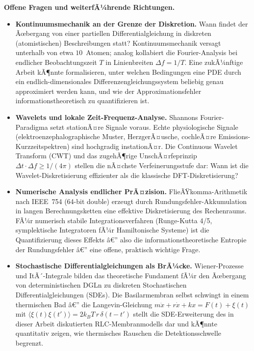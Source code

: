 ﻿\documentclass[12pt,a4paper,titlepage]{report}
\begin{document}
\textbf{Offene Fragen und weiterfÃ¼hrende Richtungen.}
\begin{itemize}[leftmargin=2em]
  \item \textbf{Kontinuumsmechanik an der Grenze der Diskretion.}
    Wann findet der Ãœbergang von einer partiellen Differentialgleichung
    in diskreten (atomistischen) Beschreibungen statt?
    Kontinuumsmechanik versagt unterhalb von etwa $10$~Atomen;
    analog kollabiert die Fourier-Analysis bei endlicher Beobachtungszeit
    $T$ in Linienbreiten $\Delta f = 1/T$.
    Eine zukÃ¼nftige Arbeit kÃ¶nnte formalisieren, unter welchen Bedingungen
    eine PDE durch ein endlich-dimensionales Differenzengleichungssystem
    beliebig genau approximiert werden kann, und wie der Approximationsfehler
    informationstheoretisch zu quantifizieren ist.
  \item \textbf{Wavelets und lokale Zeit-Frequenz-Analyse.}
    Shannons Fourier-Paradigma setzt stationÃ¤re Signale voraus.
    Echte physiologische Signale (elektroenzephalographische Muster,
    HerzgerÃ¤usche, cochleÃ¤re Emissions-Kurzzeitspektren) sind
    hochgradig instationÃ¤r.
    Die Continuous Wavelet Transform (CWT) und das zugehÃ¶rige
    UnschÃ¤rfeprinzip $\Delta t \cdot \Delta f \geq 1/(4\pi)$
    stellen die nÃ¤chste Verfeinerungsstufe dar:
    Wann ist die Wavelet-Diskretisierung effizienter als die
    klassische DFT-Diskretisierung?
  \item \textbf{Numerische Analysis endlicher PrÃ¤zision.}
    FlieÃŸkomma-Arithmetik nach IEEE~754 (64-bit double) erzeugt durch
    Rundungsfehler-Akkumulation in langen Berechnungsketten eine
    effektive Diskretisierung des Rechenraums.
    FÃ¼r numerisch stabile Integrationsverfahren (Runge-Kutta 4/5,
    symplektische Integratoren fÃ¼r Hamiltonische Systeme) ist die
    Quantifizierung dieses Effekts â€” also die informationstheoretische
    Entropie der Rundungsfehler â€” eine offene, praktisch wichtige Frage.
  \item \textbf{Stochastische Differentialgleichungen als BrÃ¼cke.}
    Wiener-Prozesse und ItÃ´-Integrale bilden das theoretische
    Fundament fÃ¼r den Ãœbergang von deterministischen DGLn
    zu diskreten Stochastischen Differentialgleichungen (SDEs).
    Die Basilarmembran selbst schwingt in einem thermischen Bad â€”
    die Langevin-Gleichung
    $m\ddot{x} + r\dot{x} + kx = F(t) + \xi(t)$
    mit $\langle\xi(t)\xi(t')\rangle = 2k_BT\,r\,\delta(t-t')$
    stellt die SDE-Erweiterung des in dieser Arbeit diskutierten
    RLC-Membranmodells dar und kÃ¶nnte quantitativ zeigen,
    wie thermisches Rauschen die Detektionsschwelle begrenzt.
\end{itemize}
\end{document}
